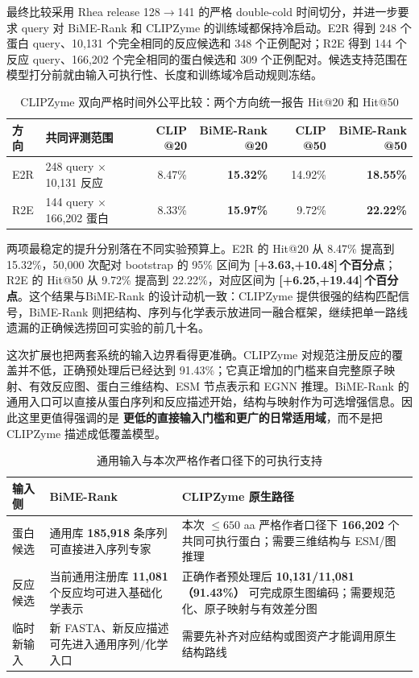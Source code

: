 \documentclass[11pt,a4paper]{ctexart}
\newcommand{\pp}{\,个百分点}
\begin{document}
最终比较采用 Rhea release 128$\rightarrow$141 的严格 double-cold 时间切分，并进一步要求 query 对 BiME-Rank 和 CLIPZyme 的训练域都保持冷启动。E2R 得到 248 个蛋白 query、10,131 个完全相同的反应候选和 348 个正例配对；R2E 得到 144 个反应 query、166,202 个完全相同的蛋白候选和 309 个正例配对。候选支持范围在模型打分前就由输入可执行性、长度和训练域冷启动规则冻结。

\begin{table}[htbp]
\centering
\small
\caption{CLIPZyme 双向严格时间外公平比较：两个方向统一报告 Hit@20 和 Hit@50}
\begin{tabularx}{\textwidth}{@{}L{14mm}Yrrrr@{}}
\toprule
\textbf{方向} & \textbf{共同评测范围} &
\textbf{CLIP @20} & \textbf{BiME-Rank @20} &
\textbf{CLIP @50} & \textbf{BiME-Rank @50}\\
\midrule
E2R & 248 query $\times$ 10,131 反应 &
8.47\% & \textbf{15.32\%} &
14.92\% & \textbf{18.55\%}\\
R2E & 144 query $\times$ 166,202 蛋白 &
8.33\% & \textbf{15.97\%} &
9.72\% & \textbf{22.22\%}\\
\bottomrule
\end{tabularx}
\end{table}

两项最稳定的提升分别落在不同实验预算上。E2R 的 Hit@20 从 8.47\% 提高到 15.32\%，50,000 次配对 bootstrap 的 95\% 区间为 \textbf{[+3.63,+10.48]\pp}；R2E 的 Hit@50 从 9.72\% 提高到 22.22\%，对应区间为 \textbf{[+6.25,+19.44]\pp}。这个结果与BiME-Rank 的设计动机一致：CLIPZyme 提供很强的结构匹配信号，BiME-Rank 则把结构、序列与化学表示放进同一融合框架，继续把单一路线遗漏的正确候选捞回可实验的前几十名。

这次扩展也把两套系统的输入边界看得更准确。CLIPZyme 对规范注册反应的覆盖并不低，正确预处理后已经达到 91.43\%；它真正增加的门槛来自完整原子映射、有效反应图、蛋白三维结构、ESM 节点表示和 EGNN 推理。BiME-Rank 的通用入口可以直接从蛋白序列和反应描述开始，结构与映射作为可选增强信息。因此这里更值得强调的是 \textbf{更低的直接输入门槛和更广的日常适用域}，而不是把 CLIPZyme 描述成低覆盖模型。

\begin{table}[htbp]
\centering
\small
\caption{通用输入与本次严格作者口径下的可执行支持}
\begin{tabularx}{\textwidth}{@{}L{30mm}L{48mm}Y@{}}
\toprule
\textbf{输入侧} & \textbf{BiME-Rank} & \textbf{CLIPZyme 原生路径}\\
\midrule
蛋白候选 & 通用库 \textbf{185,918} 条序列可直接进入序列专家 & 本次 $\leq650$ aa 严格作者口径下 \textbf{166,202} 个共同可执行蛋白；需要三维结构与 ESM/图推理\\
反应候选 & 当前通用注册库 \textbf{11,081} 个反应均可进入基础化学表示 & 正确作者预处理后 \textbf{10,131/11,081（91.43\%）} 可完成原生图编码；需要规范化、原子映射与有效差分图\\
临时新输入 & 新 FASTA、新反应描述可先进入通用序列/化学入口 & 需要先补齐对应结构或图资产才能调用原生结构路线\\
\bottomrule
\end{tabularx}
\end{table}
\end{document}

